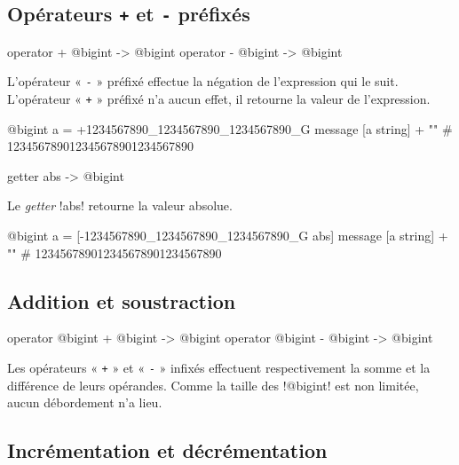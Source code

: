 \subsection{Opérateurs \texttt{+} et \texttt{-} préfixés}

\begin{galgas3box}
operator + @bigint -> @bigint
operator - @bigint -> @bigint
\end{galgas3box}

L'opérateur « \texttt{-} » préfixé effectue la négation de l'expression qui le suit. L'opérateur « \texttt{+} » préfixé n'a aucun effet, il retourne la valeur de l'expression.

\begin{galgas3}
@bigint a = +1234567890_1234567890_1234567890_G
message [a string] + "\n" # 123456789012345678901234567890
\end{galgas3}










\begin{galgas3box}
getter abs -> @bigint
\end{galgas3box}

Le \emph{getter} \ggst!abs! retourne la valeur absolue.

\begin{galgas3}
@bigint a = [-1234567890_1234567890_1234567890_G abs]
message [a string] + "\n" # 123456789012345678901234567890
\end{galgas3}






\subsection{Addition et soustraction}

\begin{galgas3box}
operator @bigint + @bigint -> @bigint
operator @bigint - @bigint -> @bigint
\end{galgas3box}

Les opérateurs « \texttt{+} » et « \texttt{-} » infixés effectuent respectivement la somme et la différence de leurs opérandes. Comme la taille des \ggst!@bigint! est non limitée, aucun débordement n'a lieu.


\subsection{Incrémentation et décrémentation}

